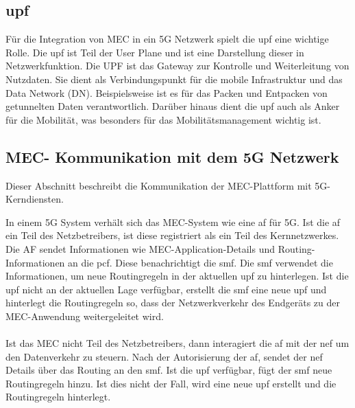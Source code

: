 \documentclass[runningheads]{llncs}
\numberwithin{figure}{section}
\begin{document}
\subsection{\acrfull{upf}}
Für die Integration von MEC in ein 5G Netzwerk spielt die \acrfull{upf} eine wichtige Rolle. Die \acrshort{upf} ist Teil der User Plane
und ist eine Darstellung dieser in Netzwerkfunktion. Die UPF ist das Gateway zur Kontrolle und Weiterleitung von Nutzdaten. 
Sie dient als Verbindungspunkt für die mobile Infrastruktur und das Data Network (DN). Beispielsweise ist es für das Packen und Entpacken von 
getunnelten Daten verantwortlich. Darüber hinaus dient die \acrshort{upf} auch als Anker für die Mobilität, was besonders für das Mobilitätsmanagement wichtig ist.
\cite{Leitfaden5GCampusnetze2020}
\subsection{MEC- Kommunikation mit dem 5G Netzwerk}
Dieser Abschnitt beschreibt die Kommunikation der MEC-Plattform mit 5G-Kerndiensten.

In einem 5G System verhält sich das MEC-System wie eine \acrfull{af} für 5G. Ist die \acrshort{af} ein Teil des Netzbetreibers, ist diese 
registriert als ein Teil des Kernnetzwerkes. Die AF sendet Informationen wie MEC-Application-Details und Routing-Informationen 
an die \acrshort{pcf}. Diese benachrichtigt die \acrshort{smf}. Die \acrlong{smf} verwendet die Informationen, um neue Routingregeln in der
aktuellen \acrshort{upf} zu hinterlegen. Ist die \acrshort{upf} nicht an der aktuellen Lage verfügbar, erstellt die \acrshort{smf} eine 
neue \acrshort{upf} und hinterlegt die Routingregeln so, dass der Netzwerkverkehr des Endgeräts zu der MEC-Anwendung weitergeleitet wird.
\\
\\
Ist das MEC nicht Teil des Netzbetreibers, dann interagiert die \acrshort{af} mit der \acrshort{nef} um den Datenverkehr zu steuern.
Nach der Autorisierung der \acrshort{af}, sendet der \acrshort{nef} Details über das Routing an den \acrshort{smf}. Ist die \acrshort{upf}
verfügbar, fügt der \acrshort{smf} neue Routingregeln hinzu. Ist dies nicht der Fall, wird eine neue \acrshort{upf} erstellt und die Routingregeln
hinterlegt.
\end{document}
